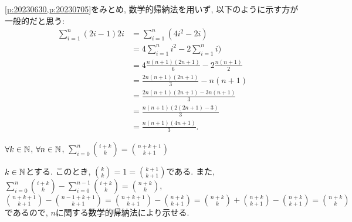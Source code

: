 \begin{rem}
  \cref{p:20230630,p:20230705}をみとめ,
  数学的帰納法を用いず, 以下のように示す方が一般的だと思う:
  \begin{align*}
    \sum_{i=1}^n (2i-1)2i
    &=\sum_{i=1}^n (4i^2-2i)\\
    &=4\sum_{i=1}^n i^2-2\sum_{i=1}^ni)\\
    &=4\frac{n(n+1)(2n+1)}{6}-2\frac{n(n+1)}{2}\\
    &=\frac{2n(n+1)(2n+1)}{3}-n(n+1)\\
    &=\frac{2n(n+1)(2n+1)-3n(n+1)}{3}\\
    &=\frac{n(n+1)(2(2n+1)-3)}{3}\\
    &=\frac{n(n+1)(4n+1)}{3}.
  \end{align*}
\end{rem}


\begin{prop}
  \label{p:20230717}
  $\forall k\in\mathbb{N}$,
  $\forall n\in\mathbb{N}$, $\sum_{i=0}^n \binom{i+k}{k}=\binom{n+k+1}{k+1}$
\end{prop}

\begin{proof**}
  $k\in\mathbb{N}$とする.
  このとき,
  $\binom{k}{k}=1=\binom{k+1}{k+1}$である.
  また,
  $\sum_{i=0}^n \binom{i+k}{k}-\sum_{i=0}^{n-1} \binom{i+k}{k}=\binom{n+k}{k}$,
  $\binom{n+k+1}{k+1}-\binom{n-1+k+1}{k+1}=\binom{n+k+1}{k+1}-\binom{n+k}{k+1}=\binom{n+k}{k}+\binom{n+k}{k+1}-\binom{n+k}{k+1}=\binom{n+k}{k}$
  であるので,
  $n$に関する数学的帰納法により示せる.
\end{proof**}


